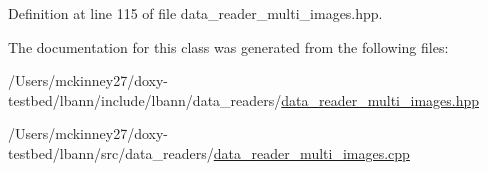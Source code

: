 Definition at line 115 of file data\+\_\+reader\+\_\+multi\+\_\+images.\+hpp.



The documentation for this class was generated from the following files\+:\begin{DoxyCompactItemize}
\item 
/\+Users/mckinney27/doxy-\/testbed/lbann/include/lbann/data\+\_\+readers/\hyperlink{data__reader__multi__images_8hpp}{data\+\_\+reader\+\_\+multi\+\_\+images.\+hpp}\item 
/\+Users/mckinney27/doxy-\/testbed/lbann/src/data\+\_\+readers/\hyperlink{data__reader__multi__images_8cpp}{data\+\_\+reader\+\_\+multi\+\_\+images.\+cpp}\end{DoxyCompactItemize}
